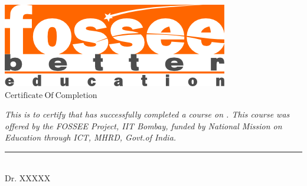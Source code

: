 \documentclass[20pt, a4paper]{extarticle}
\begin{document}
  
\pagestyle{empty}



\begin{minipage}{\linewidth}

\hspace{18 cm}
\includegraphics[scale = 0.7]{certificate_images/fossee_logo.png}
\centering \large \bfseries
{\Huge
\vskip2cm \color{blue!50!black} \hspace{2cm}   $\boldsymbol{\mathrm { Certificate \ Of\    Completion}}$ }
\end{minipage}

\vskip2.5cm
\doublespacing
\RaggedRight
{ \normalsize
{}\selectfont

\normalsize \emph{{\hspace{4cm} This is to certify that {\color {blue!50!black}  }has successfully completed a course on { \color{blue!50!black} }. This course was offered by the {\color{red!50!black} FOSSEE Project, IIT Bombay,} funded by National Mission on Education through ICT, MHRD, Govt.of India.
}}}



\singlespacing
\small


\hspace{3 cm}
\vskip1cm
\begin{minipage}{0.2\linewidth}
\centering
\rule{5cm}{1pt}\\
Dr. XXXXX\\
\end{minipage}\hfill
\end{document}

